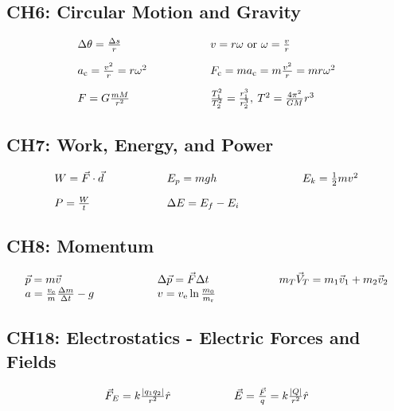 \documentclass[12pt,a4paper]{article}
\begin{document}
\subsection{CH6: Circular Motion and Gravity}
\begin{align*}
\begin{array}{l@{\hspace{2cm}}l}
\Delta \theta=\frac{\Delta s}{r} & v=r \omega \text{ or } \omega=\frac{v}{r} \\[1em]
a_{\mathrm{c}}=\frac{v^2}{r} = r \omega^2 & F_{\mathrm{c}}=m a_{\mathrm{c}}=m \frac{v^2}{r}=m r \omega^2 \\[1em]
F=G \frac{m M}{r^2} & \frac{T_1^2}{T_2^2}=\frac{r_1^3}{r_2^3}, \: T^2=\frac{4 \pi^2}{G M} r^3
\end{array}
\end{align*}

\subsection{CH7: Work, Energy, and Power}

\begin{align*}
  \begin{array}{l@{\hspace{2cm}}l@{\hspace{2cm}}l}
    W = \vec{F} \cdot \vec{d} & E_p = mgh & E_k = \frac{1}{2}mv^2 \\[1em]
    P = \frac{W}{t} & \Delta E = E_f - E_i &
  \end{array}
\end{align*}

\subsection{CH8: Momentum}

\begin{align*}
  \begin{array}{l@{\hspace{2cm}}l@{\hspace{2cm}}l}
    \vec{p} = m\vec{v} & \Delta \vec{p} = \vec{F}\Delta t & m_T \vec{V}_T = m_1 \vec{v}_1 + m_2 \vec{v}_2 \\
    a=\frac{v_{\mathrm{e}}}{m} \frac{\Delta m}{\Delta t}-g & v=v_{\mathrm{e}} \ln \frac{m_0}{m_{\mathrm{r}}} &
  \end{array}
\end{align*}

\subsection{CH18: Electrostatics - Electric Forces and Fields}
\begin{align*}
\begin{array}{l@{\hspace{2cm}}l}
\vec{F}_E = k\frac{|q_1 q_2|}{r^2}\hat{r} & \vec{E} = \frac{\vec{F}}{q} = k\frac{|Q|}{r^2}\hat{r} \\[1em]
\end{array}
\end{align*}
\end{document}
